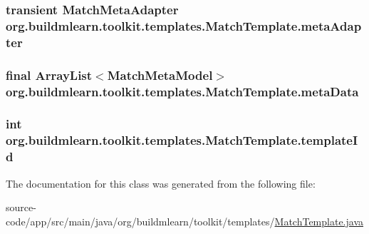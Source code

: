 \subsubsection[{\texorpdfstring{meta\+Adapter}{metaAdapter}}]{\setlength{\rightskip}{0pt plus 5cm}transient Match\+Meta\+Adapter org.\+buildmlearn.\+toolkit.\+templates.\+Match\+Template.\+meta\+Adapter\hspace{0.3cm}{\ttfamily [private]}}\hypertarget{classorg_1_1buildmlearn_1_1toolkit_1_1templates_1_1MatchTemplate_afe51cede6dfe764bfbfd8669813105b3}{}\label{classorg_1_1buildmlearn_1_1toolkit_1_1templates_1_1MatchTemplate_afe51cede6dfe764bfbfd8669813105b3}
\subsubsection[{\texorpdfstring{meta\+Data}{metaData}}]{\setlength{\rightskip}{0pt plus 5cm}final Array\+List$<${\bf Match\+Meta\+Model}$>$ org.\+buildmlearn.\+toolkit.\+templates.\+Match\+Template.\+meta\+Data\hspace{0.3cm}{\ttfamily [private]}}\hypertarget{classorg_1_1buildmlearn_1_1toolkit_1_1templates_1_1MatchTemplate_a5c473fec959674567ce8c75964c9ff60}{}\label{classorg_1_1buildmlearn_1_1toolkit_1_1templates_1_1MatchTemplate_a5c473fec959674567ce8c75964c9ff60}
\subsubsection[{\texorpdfstring{template\+Id}{templateId}}]{\setlength{\rightskip}{0pt plus 5cm}int org.\+buildmlearn.\+toolkit.\+templates.\+Match\+Template.\+template\+Id\hspace{0.3cm}{\ttfamily [private]}}\hypertarget{classorg_1_1buildmlearn_1_1toolkit_1_1templates_1_1MatchTemplate_a2e7eea6a94cc7e7c08e4db7dc31d4a7c}{}\label{classorg_1_1buildmlearn_1_1toolkit_1_1templates_1_1MatchTemplate_a2e7eea6a94cc7e7c08e4db7dc31d4a7c}


The documentation for this class was generated from the following file\+:\begin{DoxyCompactItemize}
\item 
source-\/code/app/src/main/java/org/buildmlearn/toolkit/templates/\hyperlink{MatchTemplate_8java}{Match\+Template.\+java}\end{DoxyCompactItemize}
